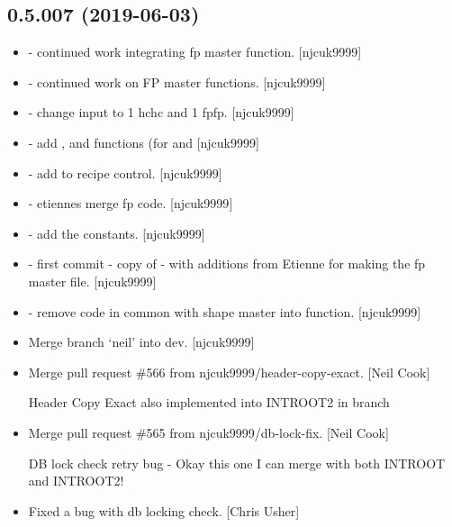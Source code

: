 \documentclass[a4paper,10pt,english]{report}
\begin{document}
\subsection{0.5.007 (2019-06-03)}
\label{\detokenize{misc/changelog:id129}}\begin{itemize}
\item {} 
 - continued work integrating fp master function.
{[}njcuk9999{]}

\item {} 
 - continued work on FP master functions. {[}njcuk9999{]}

\item {} 
 - change input to 1 hchc and 1 fpfp. {[}njcuk9999{]}

\item {} 
 - add ,  and
 functions (for  and 
{[}njcuk9999{]}

\item {} 
 - add  to recipe control.
{[}njcuk9999{]}

\item {} 
 - etiennes merge fp code. {[}njcuk9999{]}

\item {} 
 - add the  constants.
{[}njcuk9999{]}

\item {} 
 - first commit - copy of  -
with additions from Etienne for making the fp master file. {[}njcuk9999{]}

\item {} 
 - remove code in common with shape master
into function. {[}njcuk9999{]}

\item {} 
Merge branch ‘neil’ into dev. {[}njcuk9999{]}

\item {} 
Merge pull request \#566 from njcuk9999/header-copy-exact. {[}Neil Cook{]}

Header Copy Exact \textendash{} also implemented into INTROOT2 in  branch

\item {} 
Merge pull request \#565 from njcuk9999/db-lock-fix. {[}Neil Cook{]}

DB lock check retry bug - Okay this one I can merge with both INTROOT and INTROOT2!

\item {} 
Fixed a bug with db locking check. {[}Chris Usher{]}

\end{itemize}
\end{document}
